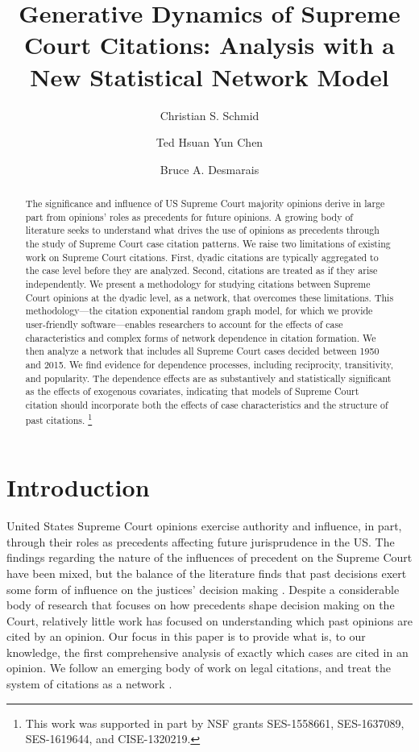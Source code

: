 \documentclass{cup-pan}
\title{Generative Dynamics of Supreme Court Citations: Analysis with a New Statistical Network Model}
\author[1]{Christian S. Schmid}
\author[2]{Ted Hsuan Yun Chen}
\author[3]{Bruce A. Desmarais}
\affil[1]{Department of Statistics, The Pennsylvania State University, University Park, PA. Email: \url{schmid@psu.edu}}
\affil[2]{Faculty of Social Sciences, University of Helsinki, Finland. Email: \url{ted.hsuanyun.chen@gmail.com}}
\affil[3]{Department of Political Science, The Pennsylvania State University, University Park, PA. Email: \url{bdesmarais@psu.edu}}
\begin{document}
\maketitle

\begin{abstract}
\noindent The significance and influence of US Supreme Court majority opinions derive in large part from opinions' roles as precedents for future opinions. A growing body of literature seeks to understand what drives the use of opinions as precedents through the study of Supreme Court case citation patterns. We raise two limitations of existing work on Supreme Court citations. First, dyadic citations are typically aggregated to the case level before they are analyzed. Second, citations are treated as if they arise independently. We present a methodology for studying citations between Supreme Court opinions at the dyadic level, as a network, that overcomes these limitations. This methodology---the citation exponential random graph model, for which we provide user-friendly software---enables researchers to account for the effects of case characteristics and complex forms of network dependence in citation formation. We then analyze a network that includes all Supreme Court cases decided between 1950 and 2015. We find evidence for dependence processes, including reciprocity, transitivity, and popularity. The dependence effects are as substantively and statistically significant as the effects of exogenous covariates, indicating that models of Supreme Court citation should incorporate both the effects of case characteristics and the structure of past citations. \footnote{
This work was supported in part by NSF grants SES-1558661, SES-1637089, SES-1619644, and CISE-1320219. }


\end{abstract}

\section{Introduction}
\label{sec:overview}

United States Supreme Court opinions exercise authority and influence, in part, through their roles as precedents affecting future jurisprudence in the US. The findings regarding the nature of the influences of precedent on the Supreme Court have been mixed, but the balance of the literature finds that past decisions exert some form of influence on the justices' decision making \citep{knight1996norm,gillman2001s,richards2002jurisprudential,hansford2006politics,bailey2008does,bailey2011constrained,pang2012endogenous}. Despite a considerable body of research that focuses on how precedents shape decision making on the Court, relatively little work has focused on understanding which past opinions are cited by an opinion. Our focus in this paper is to provide what is, to our knowledge, the first comprehensive analysis of exactly which cases are cited in an opinion. We follow an emerging body of work on legal citations, and treat the system of citations as a network \citep[e.g., ][]{caldeira1988legal,fowler2007network, fowler2008authority,bommarito2009law,lupu2012precedent,pelc2014politics,ethayarajh2018rose}. 
\end{document}
